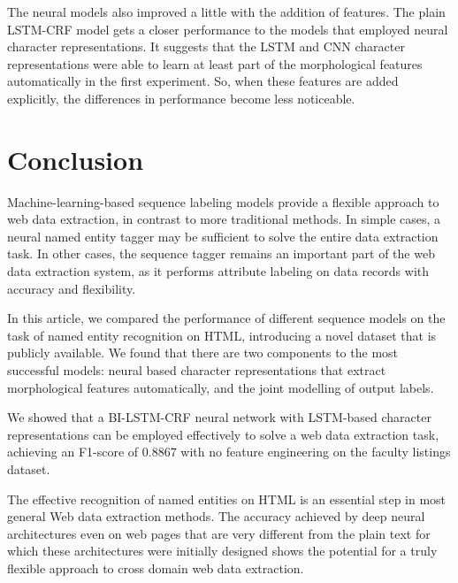 \documentclass{nle}
\begin{document}
The neural models also improved a little with the addition of features. The plain LSTM-CRF
model gets a closer performance to the models that employed neural character 
representations. It suggests that the LSTM and CNN character representations 
were able to learn at least part of the morphological features automatically in the
first experiment. So, when these features are added explicitly, the differences 
in performance become less noticeable.

\section{Conclusion}

Machine-learning-based sequence labeling models provide a flexible approach to web data 
extraction, in contrast to more traditional methods. In simple cases, a neural
named entity tagger may be sufficient to solve the entire data extraction task. In 
other cases, the sequence tagger remains an important part of the web data extraction
system, as it performs attribute labeling on data records with accuracy and flexibility.

In this article, we compared the performance of different sequence models on the task of
named entity recognition on HTML, introducing a novel dataset that is publicly available. 
We found that there are two components to the most successful models: neural based character 
representations that extract morphological features automatically, and the joint modelling 
of output labels.

We showed that a BI-LSTM-CRF neural network with LSTM-based character representations can 
be employed effectively to solve a web data extraction task, achieving an F1-score of 
0.8867 with no feature engineering on the faculty listings dataset.

The effective recognition of named entities on HTML is an essential step in most general 
Web data extraction methods. The accuracy achieved by deep neural architectures even
on web pages that are very different from the plain text for which these architectures 
were initially designed shows the potential for a truly flexible approach to cross domain 
web data extraction.

% 
% 
\end{document}
